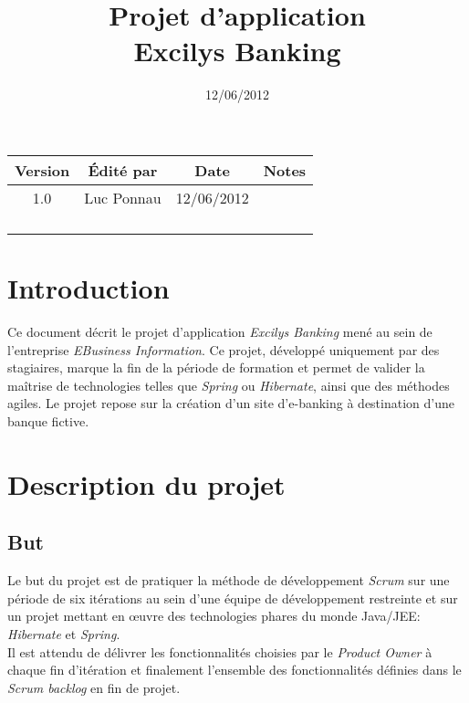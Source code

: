 \documentclass[11pt]{article}
\title{Projet d'application\\Excilys Banking}
\date{12/06/2012}
\begin{document}
\maketitle

\begin{center}
\begin{tabular}{ | c | c | c | c | }
\hline \textbf{Version} & \textbf{Édité par} & \textbf{Date} & \textbf{Notes} \\
\hline 1.0 & Luc Ponnau & 12/06/2012 &  \\
\hline & & & \\
\hline & & & \\
\hline & & & \\
\hline & & & \\ \hline
\end{tabular}
\end{center}

\section{Introduction}

Ce document décrit le projet d'application \emph{Excilys Banking} mené au sein
de l'entreprise \emph{EBusiness Information}. Ce projet, développé uniquement
par des stagiaires, marque la fin de la période de formation et permet de
valider la maîtrise de technologies telles que \emph{Spring} ou \emph{Hibernate},
ainsi que des méthodes agiles. Le projet repose sur la création d'un site
d'e-banking à destination d'une banque fictive.

\section{Description du projet}

\subsection{But}

Le but du projet est de pratiquer la méthode de développement \emph{Scrum} sur
une période de six itérations au sein d'une équipe de développement
restreinte et sur un projet mettant en \oe{}uvre
des technologies phares du monde Java/JEE: \emph{Hibernate} et \emph{Spring}.\\

Il est attendu de délivrer les fonctionnalités choisies par le \emph{Product Owner}
à chaque fin d'itération et finalement l'ensemble des fonctionnalités définies
dans le \emph{Scrum backlog} en fin de projet.\\
\end{document}
